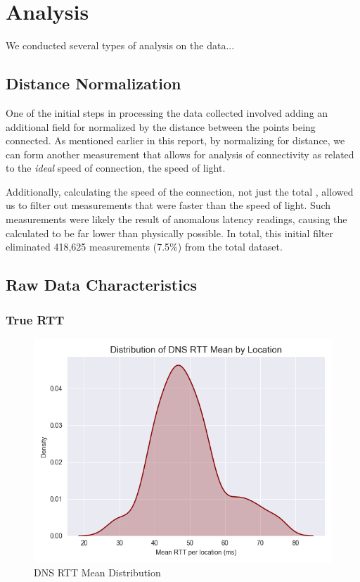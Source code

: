 \section{Analysis}\label{sec:dns_analysis} %

We conducted several types of analysis on the \dns data...

\subsection{Distance Normalization}
One of the initial steps in processing the data collected involved adding an additional field for \rtt normalized by the distance between the points being connected. As mentioned earlier in this report, by normalizing for distance, we can form another measurement that allows for analysis of connectivity as related to the \textit{ideal} speed of connection, the speed of light.

Additionally, calculating the speed of the connection, not just the total \rtt, allowed us to filter out measurements that were faster than the speed of light. Such measurements were likely the result of anomalous latency readings, causing the calculated \rtt to be far lower than physically possible. In total, this initial filter eliminated 418,625 measurements (7.5\%) from the total dataset.

\subsection{Raw Data Characteristics}

\subsubsection{True RTT}
\begin{figure}[H]
    \centering
    \includegraphics[width=\textwidth]{images/dns/dist_raw_data/dns_rtt_mean_distribution.png}
    \caption{DNS RTT Mean Distribution}
    \label{fig:dns_analytics_mean_dist}
\end{figure}

